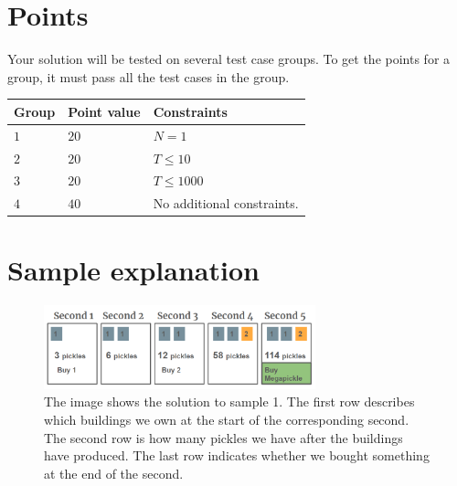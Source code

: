 \section*{Points}
Your solution will be tested on several test case groups.
To get the points for a group, it must pass all the test cases in the group.

\noindent
\begin{tabular}{| l | l | p{12cm} |}
  \hline
  \textbf{Group} & \textbf{Point value} & \textbf{Constraints} \\ \hline
  $1$    & $20$       & $N=1$ \\ \hline
  $2$    & $20$       & $T \leq 10$ \\ \hline
  $3$    & $20$       & $T \leq 1000$ \\ \hline
  $4$    & $40$       & No additional constraints. \\ \hline
\end{tabular}

\section*{Sample explanation}

\begin{figure}[h]
  \centering
  \includegraphics[width=0.7\textwidth]{sample1-en.PNG}
    \\The image shows the solution to sample 1. The first row describes which buildings 
    we own at the start of the corresponding second. The second row is how many pickles 
    we have after the buildings have produced. The last row indicates whether we bought
    something at the end of the second.
  
\end{figure}
